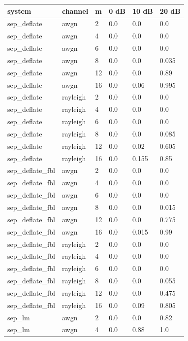 \begin{tabular}{llllll}
\hline
system & channel & m & 0 dB & 10 dB & 20 dB \\
\hline
sep\_deflate & awgn & 2 & 0.0 & 0.0 & 0.0 \\
sep\_deflate & awgn & 4 & 0.0 & 0.0 & 0.0 \\
sep\_deflate & awgn & 6 & 0.0 & 0.0 & 0.0 \\
sep\_deflate & awgn & 8 & 0.0 & 0.0 & 0.035 \\
sep\_deflate & awgn & 12 & 0.0 & 0.0 & 0.89 \\
sep\_deflate & awgn & 16 & 0.0 & 0.06 & 0.995 \\
sep\_deflate & rayleigh & 2 & 0.0 & 0.0 & 0.0 \\
sep\_deflate & rayleigh & 4 & 0.0 & 0.0 & 0.0 \\
sep\_deflate & rayleigh & 6 & 0.0 & 0.0 & 0.0 \\
sep\_deflate & rayleigh & 8 & 0.0 & 0.0 & 0.085 \\
sep\_deflate & rayleigh & 12 & 0.0 & 0.02 & 0.605 \\
sep\_deflate & rayleigh & 16 & 0.0 & 0.155 & 0.85 \\
sep\_deflate\_fbl & awgn & 2 & 0.0 & 0.0 & 0.0 \\
sep\_deflate\_fbl & awgn & 4 & 0.0 & 0.0 & 0.0 \\
sep\_deflate\_fbl & awgn & 6 & 0.0 & 0.0 & 0.0 \\
sep\_deflate\_fbl & awgn & 8 & 0.0 & 0.0 & 0.015 \\
sep\_deflate\_fbl & awgn & 12 & 0.0 & 0.0 & 0.775 \\
sep\_deflate\_fbl & awgn & 16 & 0.0 & 0.015 & 0.99 \\
sep\_deflate\_fbl & rayleigh & 2 & 0.0 & 0.0 & 0.0 \\
sep\_deflate\_fbl & rayleigh & 4 & 0.0 & 0.0 & 0.0 \\
sep\_deflate\_fbl & rayleigh & 6 & 0.0 & 0.0 & 0.0 \\
sep\_deflate\_fbl & rayleigh & 8 & 0.0 & 0.0 & 0.055 \\
sep\_deflate\_fbl & rayleigh & 12 & 0.0 & 0.0 & 0.475 \\
sep\_deflate\_fbl & rayleigh & 16 & 0.0 & 0.09 & 0.805 \\
sep\_lm & awgn & 2 & 0.0 & 0.0 & 0.82 \\
sep\_lm & awgn & 4 & 0.0 & 0.88 & 1.0 \\

\end{tabular}
